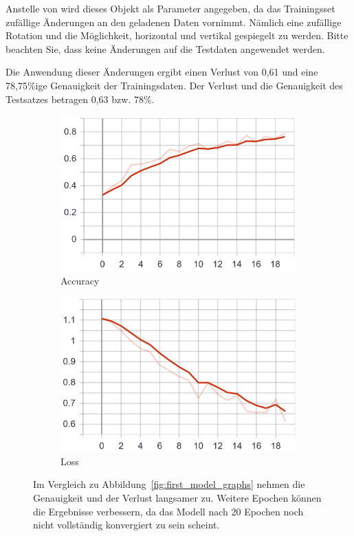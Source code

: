 Anstelle von  wird dieses Objekt als Parameter angegeben, da das Trainingsset zufällige Änderungen an den geladenen Daten vornimmt.
Nämlich eine zufällige Rotation und die Möglichkeit, horizontal und vertikal gespiegelt zu werden.
Bitte beachten Sie, dass keine Änderungen auf die Testdaten angewendet werden.

Die Anwendung dieser Änderungen ergibt einen Verlust von 0,61 und eine 78,75\%ige Genauigkeit der Trainingsdaten.
Der Verlust und die Genauigkeit des Testsatzes betragen 0,63 bzw. 78\%.

\begin{figure}
    \centering
    \begin{subfigure}[b]{0.4\textwidth}
        \includegraphics[width=\textwidth]{images/first_model_data_augmentation_acc.png}
        \caption{Accuracy}
        \label{fig:first_model_data_augmentation_acc}
    \end{subfigure}
    \begin{subfigure}[b]{0.4\textwidth}
        \includegraphics[width=\textwidth]{images/first_model_data_augmentation_loss.png}
        \caption{Loss}
        \label{fig:first_model_data_augmentation_loss}
    \end{subfigure}
    \caption{Im Vergleich zu Abbildung~\ref{fig:first_model_graphs} nehmen die Genauigkeit und der Verlust langsamer zu. Weitere Epochen können die Ergebnisse verbessern, da das Modell nach 20 Epochen noch nicht vollständig konvergiert zu sein scheint.}
    \label{fig:first_model_data_augmentation_graphs}
\end{figure}

